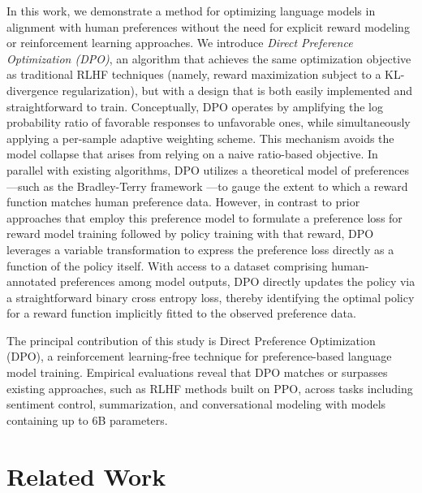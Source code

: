 In this work, we demonstrate a method for optimizing language models in alignment with human preferences without the need for explicit reward modeling or reinforcement learning approaches. We introduce \textit{{Direct Preference Optimization} (DPO)}, an algorithm that achieves the same optimization objective as traditional RLHF techniques (namely, reward maximization subject to a KL-divergence regularization), but with a design that is both easily implemented and straightforward to train. Conceptually, DPO operates by amplifying the log probability ratio of favorable responses to unfavorable ones, while simultaneously applying a per-sample adaptive weighting scheme. This mechanism avoids the model collapse that arises from relying on a naive ratio-based objective. In parallel with existing algorithms, DPO utilizes a theoretical model of preferences—such as the Bradley-Terry framework \cite{bradley1952rankanalysis}—to gauge the extent to which a reward function matches human preference data. However, in contrast to prior approaches that employ this preference model to formulate a preference loss for reward model training followed by policy training with that reward, DPO leverages a variable transformation to express the preference loss directly as a function of the policy itself. With access to a dataset comprising human-annotated preferences among model outputs, DPO directly updates the policy via a straightforward binary cross entropy loss, thereby identifying the optimal policy for a reward function implicitly fitted to the observed preference data.

The principal contribution of this study is Direct Preference Optimization (DPO), a reinforcement learning-free technique for preference-based language model training. Empirical evaluations reveal that DPO matches or surpasses existing approaches, such as RLHF methods built on PPO, across tasks including sentiment control, summarization, and conversational modeling with models containing up to 6B parameters.

\section{Related Work}

